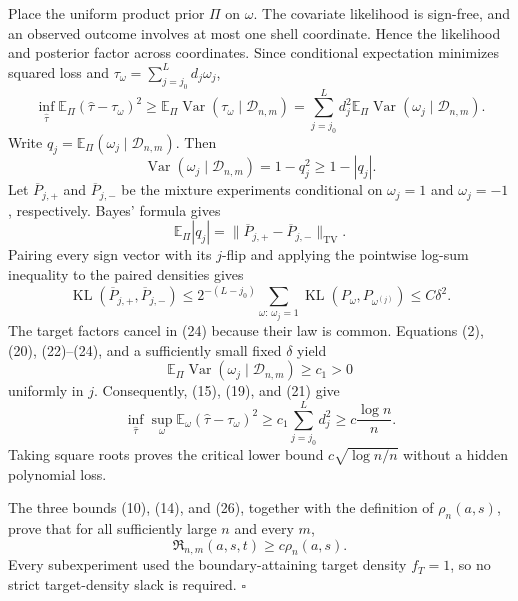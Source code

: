 Place the uniform product prior \(\Pi\) on \(\omega\). The covariate likelihood is sign-free, and an observed outcome involves at most one shell coordinate. Hence the likelihood and posterior factor across coordinates. Since conditional expectation minimizes squared loss and \(\tau_\omega=\sum_{j=j_0}^Ld_j\omega_j\),
\[
 \inf_{\widehat\tau}
 \mathbb E_\Pi(\widehat\tau-\tau_\omega)^2
 \ge
 \mathbb E_\Pi\operatorname{Var}
       (\tau_\omega\mid\mathcal D_{n,m})
 =\sum_{j=j_0}^Ld_j^2
   \mathbb E_\Pi\operatorname{Var}
       (\omega_j\mid\mathcal D_{n,m}).
\tag{21}
\]
Write \(q_j=\mathbb E_\Pi(\omega_j\mid\mathcal D_{n,m})\). Then
\[
 \operatorname{Var}(\omega_j\mid\mathcal D_{n,m})
 =1-q_j^2\ge1-|q_j|.
\tag{22}
\]
Let \(\overline P_{j,+}\) and \(\overline P_{j,-}\) be the mixture experiments conditional on \(\omega_j=1\) and \(\omega_j=-1\), respectively. Bayes' formula gives
\[
 \mathbb E_\Pi|q_j|
 =\lVert\overline P_{j,+}-\overline P_{j,-}\rVert_{\mathrm{TV}}.
\tag{23}
\]
Pairing every sign vector with its \(j\)-flip and applying the pointwise log-sum inequality to the paired densities gives
\[
 \operatorname{KL}(\overline P_{j,+},\overline P_{j,-})
 \le 2^{-(L-j_0)}
 \sum_{\omega:\,\omega_j=1}
 \operatorname{KL}(P_\omega,P_{\omega^{(j)}})
 \le C\delta^2.
\tag{24}
\]
The target factors cancel in (24) because their law is common. Equations (2), (20), (22)--(24), and a sufficiently small fixed \(\delta\) yield
\[
 \mathbb E_\Pi\operatorname{Var}
   (\omega_j\mid\mathcal D_{n,m})
 \ge c_1>0
\tag{25}
\]
uniformly in \(j\). Consequently, (15), (19), and (21) give
\[
 \inf_{\widehat\tau}\sup_\omega
 \mathbb E_\omega(\widehat\tau-\tau_\omega)^2
 \ge c_1\sum_{j=j_0}^Ld_j^2
 \ge c\frac{\log n}{n}.
\tag{26}
\]
Taking square roots proves the critical lower bound \(c\sqrt{\log n/n}\) without a hidden polynomial loss.

The three bounds (10), (14), and (26), together with the definition of \(\rho_n(a,s)\), prove that for all sufficiently large \(n\) and every \(m\),
\[
 \mathfrak R_{n,m}(a,s,t)
 \ge c\rho_n(a,s).
\]
Every subexperiment used the boundary-attaining target density \(f_T=1\), so no strict target-density slack is required. \(\square\)